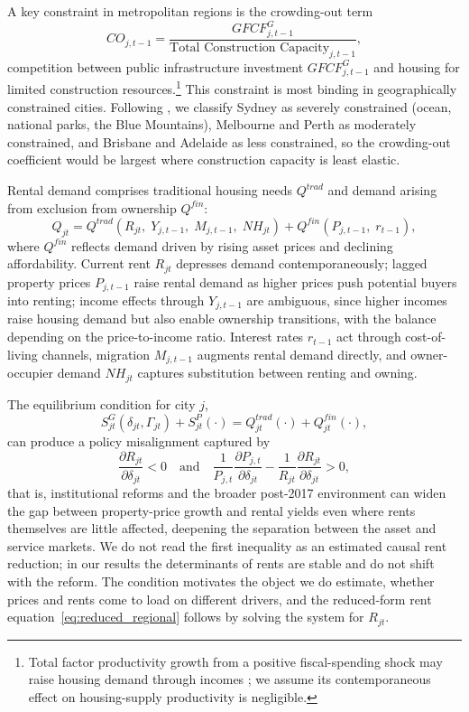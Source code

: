 \documentclass[preprint,11pt,authoryear]{elsarticle}
\begin{document}
\begin{appendices}
A key constraint in metropolitan regions is the crowding-out term
\[
CO_{j,t-1} = \frac{GFCF^G_{j,t-1}}
{\text{Total Construction Capacity}_{j,t-1}},
\]
competition between public infrastructure investment $GFCF^G_{j,t-1}$ and
housing for limited construction resources.\footnote{Total factor
productivity growth from a positive fiscal-spending shock may raise
housing demand through incomes \citep{LARSEN2025104937}; we assume its
contemporaneous effect on housing-supply productivity is negligible.}
This constraint is most binding in geographically constrained cities.
Following \citet{saiz2010geographic}, we classify Sydney as severely
constrained (ocean, national parks, the Blue Mountains), Melbourne and
Perth as moderately constrained, and Brisbane and Adelaide as less
constrained, so the crowding-out coefficient would be largest where
construction capacity is least elastic.

Rental demand comprises traditional housing needs $Q^{trad}$ and demand
arising from exclusion from ownership $Q^{fin}$:
\[
Q_{jt} = Q^{trad}(R_{jt},\; Y_{j,t-1},\; M_{j,t-1},\; NH_{jt})
+ Q^{fin}(P_{j,t-1},\; r_{t-1}),
\]
where $Q^{fin}$ reflects demand driven by rising asset prices and
declining affordability. Current rent $R_{jt}$ depresses demand
contemporaneously; lagged property prices $P_{j,t-1}$ raise rental demand
as higher prices push potential buyers into renting; income effects
through $Y_{j,t-1}$ are ambiguous, since higher incomes raise housing
demand but also enable ownership transitions, with the balance depending
on the price-to-income ratio. Interest rates $r_{t-1}$ act through
cost-of-living channels, migration $M_{j,t-1}$ augments rental demand
directly, and owner-occupier demand $NH_{jt}$ captures substitution
between renting and owning.

The equilibrium condition for city $j$,
\[
S^G_{jt}(\delta_{jt}, \Gamma_{jt}) + S^P_{jt}(\cdot)
= Q^{trad}_{jt}(\cdot) + Q^{fin}_{jt}(\cdot),
\]
can produce a policy misalignment captured by
\begin{equation}
\label{eq:incoherence}
\frac{\partial R_{jt}}{\partial \delta_{jt}} < 0
\quad \text{and} \quad
\frac{1}{P_{j,t}}\frac{\partial P_{j,t}}{\partial \delta_{jt}}
- \frac{1}{R_{jt}}\frac{\partial R_{jt}}{\partial \delta_{jt}} > 0,
\end{equation}
that is, institutional reforms and the broader post-2017 environment can
widen the gap between property-price growth and rental yields even where
rents themselves are little affected, deepening the separation between the
asset and service markets. We do not read the first inequality as an
estimated causal rent reduction; in our results the determinants of rents
are stable and do not shift with the reform. The condition motivates the
object we do estimate, whether prices and rents come to load on different
drivers, and the reduced-form rent equation~\eqref{eq:reduced_regional}
follows by solving the system for $R_{jt}$.


\end{appendices}
\end{document}
